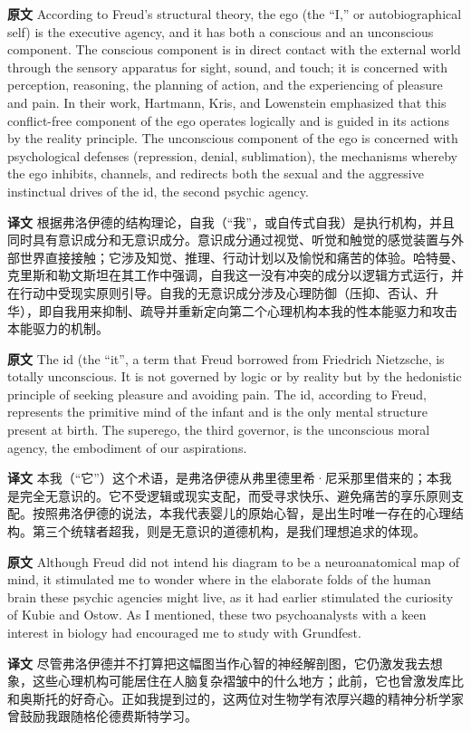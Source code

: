 \documentclass[UTF8,zihao=-4]{ctexart}
\newcommand{\BodyFont}{\fontsize{10.5pt}{15.5pt}\selectfont}
\newcommand{\origlabel}{\textbf{原文}\quad}
\newcommand{\translabel}{\textbf{译文}\quad}
\newenvironment{enblock}{\par\noindent\begingroup\BodyFont\origlabel}{\par\endgroup}
\newenvironment{zhblock}{\par\noindent\begingroup\BodyFont\translabel}{\par\endgroup\vspace{0.35em}}
\begin{document}
\begin{enblock}
According to Freud's structural theory, the ego (the “I,” or autobiographical self) is the executive agency, and it has both a conscious and an unconscious component. The conscious component is in direct contact with the external world through the sensory apparatus for sight, sound, and touch; it is concerned with perception, reasoning, the planning of action, and the experiencing of pleasure and pain. In their work, Hartmann, Kris, and Lowenstein emphasized that this conflict-free component of the ego operates logically and is guided in its actions by the reality principle. The unconscious component of the ego is concerned with psychological defenses (repression, denial, sublimation), the mechanisms whereby the ego inhibits, channels, and redirects both the sexual and the aggressive instinctual drives of the id, the second psychic agency.
\end{enblock}
\begin{zhblock}
根据弗洛伊德的结构理论，自我（“我”，或自传式自我）是执行机构，并且同时具有意识成分和无意识成分。意识成分通过视觉、听觉和触觉的感觉装置与外部世界直接接触；它涉及知觉、推理、行动计划以及愉悦和痛苦的体验。哈特曼、克里斯和勒文斯坦在其工作中强调，自我这一没有冲突的成分以逻辑方式运行，并在行动中受现实原则引导。自我的无意识成分涉及心理防御（压抑、否认、升华），即自我用来抑制、疏导并重新定向第二个心理机构本我的性本能驱力和攻击本能驱力的机制。\end{zhblock}

\begin{enblock}
The id (the “it”, a term that Freud borrowed from Friedrich Nietzsche, is totally unconscious. It is not governed by logic or by reality but by the hedonistic principle of seeking pleasure and avoiding pain. The id, according to Freud, represents the primitive mind of the infant and is the only mental structure present at birth. The superego, the third governor, is the unconscious moral agency, the embodiment of our aspirations.
\end{enblock}
\begin{zhblock}
本我（“它”）这个术语，是弗洛伊德从弗里德里希·尼采那里借来的；本我是完全无意识的。它不受逻辑或现实支配，而受寻求快乐、避免痛苦的享乐原则支配。按照弗洛伊德的说法，本我代表婴儿的原始心智，是出生时唯一存在的心理结构。第三个统辖者超我，则是无意识的道德机构，是我们理想追求的体现。\end{zhblock}

\begin{enblock}
Although Freud did not intend his diagram to be a neuroanatomical map of mind, it stimulated me to wonder where in the elaborate folds of the human brain these psychic agencies might live, as it had earlier stimulated the curiosity of Kubie and Ostow. As I mentioned, these two psychoanalysts with a keen interest in biology had encouraged me to study with Grundfest.
\end{enblock}
\begin{zhblock}
尽管弗洛伊德并不打算把这幅图当作心智的神经解剖图，它仍激发我去想象，这些心理机构可能居住在人脑复杂褶皱中的什么地方；此前，它也曾激发库比和奥斯托的好奇心。正如我提到过的，这两位对生物学有浓厚兴趣的精神分析学家曾鼓励我跟随格伦德费斯特学习。\end{zhblock}
\end{document}
